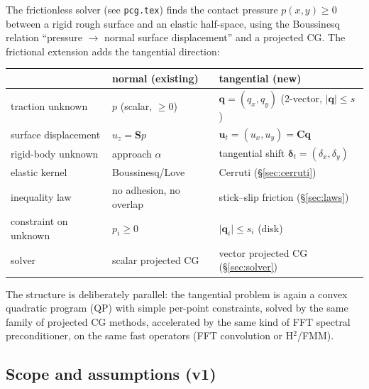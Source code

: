 \documentclass[11pt,a4paper]{article}
\newcommand{\bq}{\mathbf{q}}
\newcommand{\bu}{\mathbf{u}}
\newcommand{\bC}{\mathbf{C}}
\newcommand{\bS}{\mathbf{S}}
\newcommand{\bdelta}{\boldsymbol{\delta}}
\newcommand{\abs}[1]{\lvert#1\rvert}
\newcommand{\code}[1]{\texttt{#1}}
\begin{document}
The frictionless solver (see \code{pcg.tex}) finds the contact pressure
$p(x,y) \ge 0$ between a rigid rough surface and an elastic half-space,
using the Boussinesq relation ``pressure $\to$ normal surface displacement''
and a projected CG. The frictional extension adds the tangential direction:

\begin{center}
\begin{tabular}{lll}
\toprule
 & normal (existing) & tangential (new) \\
\midrule
traction unknown       & $p$ (scalar, $\ge 0$)  & $\bq = (q_x, q_y)$ (2-vector, $\abs{\bq} \le s$) \\
surface displacement   & $u_z = \bS p$            & $\bu_t = (u_x,u_y) = \bC \bq$ \\
rigid-body unknown     & approach $\alpha$        & tangential shift $\bdelta_t = (\delta_x,\delta_y)$ \\
elastic kernel         & Boussinesq/Love          & Cerruti (\S\ref{sec:cerruti}) \\
inequality law         & no adhesion, no overlap  & stick--slip friction (\S\ref{sec:laws}) \\
constraint on unknown  & $p_i \ge 0$              & $\abs{\bq_i} \le s_i$ (disk) \\
solver                 & scalar projected CG      & vector projected CG (\S\ref{sec:solver}) \\
\bottomrule
\end{tabular}
\end{center}

The structure is deliberately parallel: the tangential problem is again a
convex quadratic program (QP) with simple per-point constraints, solved by
the same family of projected CG methods, accelerated by the same kind of
FFT spectral preconditioner, on the same fast operators (FFT convolution or
H$^2$/FMM).

\subsection{Scope and assumptions (v1)}
\label{sec:scope}
\end{document}
